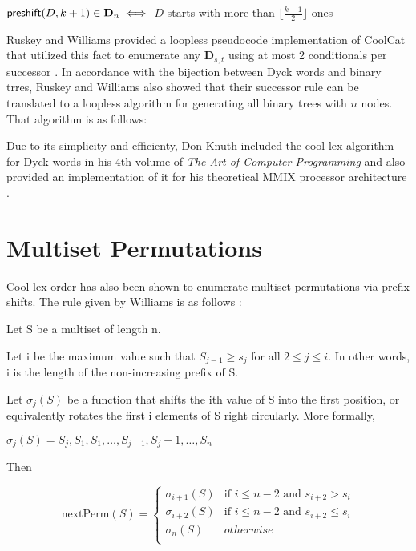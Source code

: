 $\mathsf{preshift(} D, k+1 \mathsf{)} \in \mathbf{D}_{n} \iff$ $D$ starts with more than $\lfloor \frac{k-1}{2} \rfloor$ ones

Ruskey and Williams provided a loopless pseudocode implementation of CoolCat that utilized this fact to enumerate any $\mathbf{D}_{s,t}$ using at most 2 conditionals per successor \cite{ruskey2008generating}. In accordance with the bijection between Dyck words and binary trres, Ruskey and Williams also showed that their successor rule can be translated to a loopless algorithm for generating all binary trees with $n$ nodes. That algorithm is as follows:


Due to its simplicity and efficienty, Don Knuth included the cool-lex algorithm for Dyck words in his 4th volume of \emph{The Art of Computer Programming} and also provided an implementation of it for his theoretical MMIX processor architecture \cite{knuth2015art}.

\section{Multiset Permutations}

Cool-lex order has also been shown to enumerate multiset permutations via prefix shifts.  The rule given by Williams is as follows \cite{williams2009loopless}:

\noindent Let S be a multiset of length n.

\noindent Let i be the maximum value such that $S_{j-1} \ge s_j$ for all $2 \le j \le i$.  In other words, i is the length of the non-increasing prefix of S.  

\noindent Let $\sigma_j(S)$ be a function that shifts the ith value of S into the first position, or equivalently rotates the first i elements of S right circularly.  More formally, 

\noindent $\sigma_j(S)=S_j,S_1,S_1,\dots,S_{j-1},S_j+1,\dots,S_n $

Then

\begin{equation*}
    \text{nextPerm}(S) = \begin{cases}
	\sigma_{i+1}(S) & \text{if $i \le n-2$ and $s_{i+2} > s_i$}\\
	\sigma_{i+2}(S) & \text{if $i \le n-2$ and $s_{i+2} \le s_i$}\\
	\sigma_{n}(S) & otherwise\\
\end{cases}
\end{equation*}


